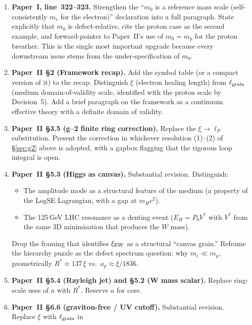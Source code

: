 \documentclass[11pt,a4paper]{article}
\begin{document}
\begin{enumerate}
\item \textbf{Paper~I, line~322--323.}  Strengthen the ``$m_0$ is a
      reference mass scale (self-consistently $m_e$ for the electron)''
      declaration into a full paragraph.  State explicitly that $m_0$ is
      defect-relative, cite the proton case as the second example, and
      forward-pointer to Paper~II's use of $m_0 = m_p$ for the proton
      breather.  This is the single most important upgrade because
      every downstream issue stems from the under-specification of $m_0$.
\item \textbf{Paper~II \S2 (Framework recap).}  Add the symbol table
      (or a compact version of it) to the recap.  Distinguish $\xi$
      (electron healing length) from $\ell_{\rm grain}$ (medium
      domain-of-validity scale, identified with the proton scale by
      Decision~5).  Add a brief paragraph on the framework as a
      continuum effective theory with a definite domain of validity.
\item \textbf{Paper~II \S3.5 (g--2 finite ring correction).}  Replace
      the $\xi \to \ell_P$ substitution.  Present the correction in
      whichever resolution (1)--(2) of \S\ref{sec:g2} above is adopted,
      with a gapbox flagging that the rigorous loop integral is open.
\item \textbf{Paper~II \S5.3 (Higgs as canvas).}  Substantial revision.
      Distinguish:
      \begin{itemize}
      \item The amplitude mode as a structural feature of the medium
            (a property of the LogSE Lagrangian, with a gap at $m_H c^2$).
      \item The 125\,GeV LHC resonance as a denting event ($E_H = P_0
            V^*$ with $V^*$ from the same 3D minimisation that produces
            the $W$ mass).
      \end{itemize}
      Drop the framing that identifies $\xi_{\rm EW}$ as a structural
      ``canvas grain.''  Reframe the hierarchy puzzle as the defect
      spectrum question: why $m_e \ll m_p$, geometrically
      $R^* \approx 137\,\xi$ vs.\ $a_p \approx \xi/1836$.
\item \textbf{Paper~II \S5.4 (Rayleigh jet) and \S5.2 (W mass scalar).}
      Replace ring-scale uses of $a$ with $R^*$.  Reserve $a$ for core.
\item \textbf{Paper~II \S6.6 (graviton-free / UV cutoff).}
      Substantial revision.  Replace $\xi$ with $\ell_{\rm grain}$ in

\end{enumerate}
\end{document}

